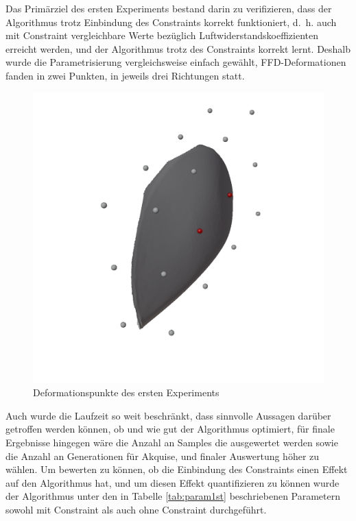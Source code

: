 Das Primärziel des ersten Experiments bestand darin zu verifizieren, dass der Algorithmus trotz Einbindung des Constraints korrekt funktioniert, d.~h. auch mit Constraint vergleichbare Werte bezüglich Luftwiderstandskoeffizienten erreicht werden, und der Algorithmus trotz des Constraints korrekt lernt.
Deshalb wurde die Parametrisierung vergleichsweise einfach gewählt, FFD-Deformationen fanden in zwei Punkten, in jeweils drei Richtungen statt.
\begin{figure}[h]
	\centering
	\includegraphics[width=.7\linewidth]{bilder/2ptDeformationPoints}
	\caption{Deformationspunkte des ersten Experiments}
	\label{fig:ffd1st}
\end{figure}
Auch wurde die Laufzeit so weit beschränkt, dass sinnvolle Aussagen darüber getroffen werden können, ob und wie gut der Algorithmus optimiert, für finale Ergebnisse hingegen wäre die Anzahl an Samples die ausgewertet werden sowie die Anzahl an Generationen für Akquise, und finaler Auswertung höher zu wählen.
Um bewerten zu können, ob die Einbindung des Constraints einen Effekt auf den Algorithmus hat, und um diesen Effekt quantifizieren zu können wurde der Algorithmus unter den in Tabelle \cref{tab:param1st} beschriebenen Parametern sowohl mit Constraint als auch ohne Constraint durchgeführt. 

